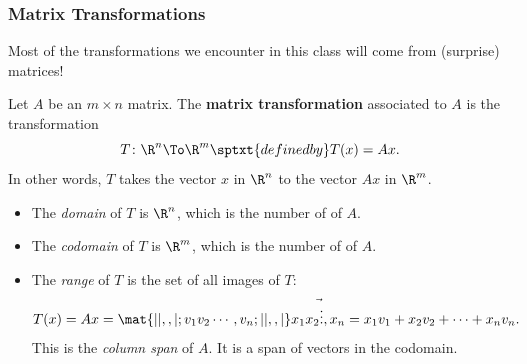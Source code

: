 \begin{frame}
\frametitle{Matrix Transformations}

Most of the transformations we encounter in this class will come from (surprise)
matrices!

\pause
\begin{defn}
  Let $A$ be an $m\times n$ matrix.  The \textbf{matrix transformation}
  associated to $A$ is the transformation
  \[ T\colon \R^n \To \R^m \sptxt{defined by} T(x) = Ax. \]
  \pause
  In other words, $T$ takes the vector $x$ in $\R^n$ to the vector $Ax$ in
  $\R^m$. 
\end{defn}

\pause
\begin{itemize}
\item {}The \emph{domain} of $T$ is \pause $\R^n$, which is
  the number of
  of $A$.
\pause\pause
\item The \emph{codomain} of $T$ is \pause $\R^m$, which is the number of
   of $A$.
\pause\pause
\item The \emph{range} of $T$ is the set of all images of $T$:
  \[ T(x) = Ax = 
  \mat{| |, , |; v_1 v_2 \cdots, v_n; | |, , |}\vec{x_1 x_2 \vdots, x_n}
  = x_1v_1 + x_2v_2 + \cdots + x_nv_n. \]
  This is the
  \pause 
  \emph{column span\/} of $A$.  It is a span of vectors in the codomain.
\end{itemize}
\pause
{}

\end{frame}



